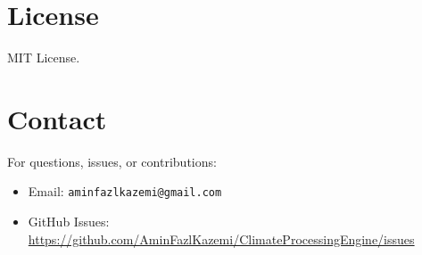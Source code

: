 ﻿\documentclass[12pt,a4paper]{report}
\begin{document}
\section{License}
MIT License.

\section{Contact}
For questions, issues, or contributions:
\begin{itemize}
    \item Email: \texttt{aminfazlkazemi@gmail.com}
    \item GitHub Issues: \url{https://github.com/AminFazlKazemi/ClimateProcessingEngine/issues}
\end{itemize}

\appendix
\end{document}
